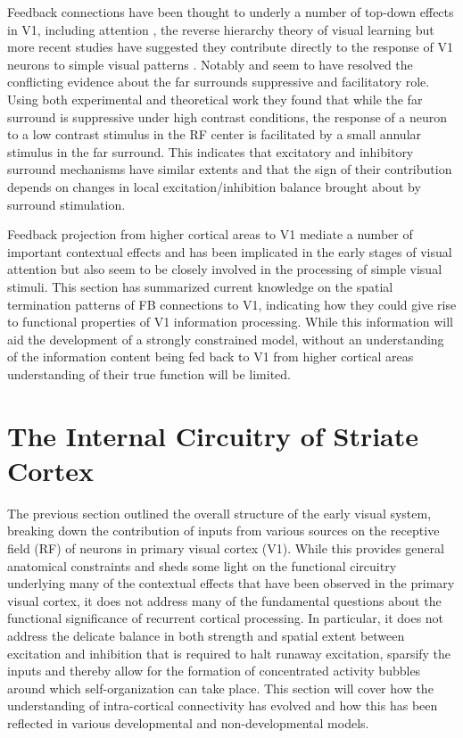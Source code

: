Feedback connections have been thought to underly a number of top-down
effects in V1, including attention \citep{Treue2003}, the reverse
hierarchy theory of visual learning \citep{Ahissar2004} but more
recent studies have suggested they contribute directly to the response
of V1 neurons to simple visual patterns
\citep{Angelucci2002,Angelucci2003,Schwabe2006}. Notably
\cite{Schwabe2006} and \cite{Ichida2007} seem to have resolved the
conflicting evidence about the far surrounds suppressive and
facilitatory role. Using both experimental and theoretical work they
found that while the far surround is suppressive under high contrast
conditions, the response of a neuron to a low contrast stimulus in the
RF center is facilitated by a small annular stimulus in the far
surround. This indicates that excitatory and inhibitory surround
mechanisms have similar extents and that the sign of their
contribution depends on changes in local excitation/inhibition balance
brought about by surround stimulation.

Feedback projection from higher cortical areas to V1 mediate a number
of important contextual effects and has been implicated in the early
stages of visual attention but also seem to be closely involved in the
processing of simple visual stimuli. This section has summarized
current knowledge on the spatial termination patterns of FB
connections to V1, indicating how they could give rise to functional
properties of V1 information processing. While this information will
aid the development of a strongly constrained model, without an
understanding of the information content being fed back to V1 from
higher cortical areas understanding of their true function will be
limited.

\section{The Internal Circuitry of Striate Cortex}

The previous section outlined the overall structure of the early visual
system, breaking down the contribution of inputs from various sources
on the receptive field (RF) of neurons in primary visual cortex
(V1). While this provides general anatomical constraints and sheds
some light on the functional circuitry underlying many of the
contextual effects that have been observed in the primary visual
cortex, it does not address many of the fundamental questions about
the functional significance of recurrent cortical processing. In
particular, it does not address the delicate balance in both strength
and spatial extent between excitation and inhibition that is required
to halt runaway excitation, sparsify the inputs and thereby allow for
the formation of concentrated activity bubbles around which
self-organization can take place. This section will cover how the
understanding of intra-cortical connectivity has evolved and how this
has been reflected in various developmental and non-developmental
models.

